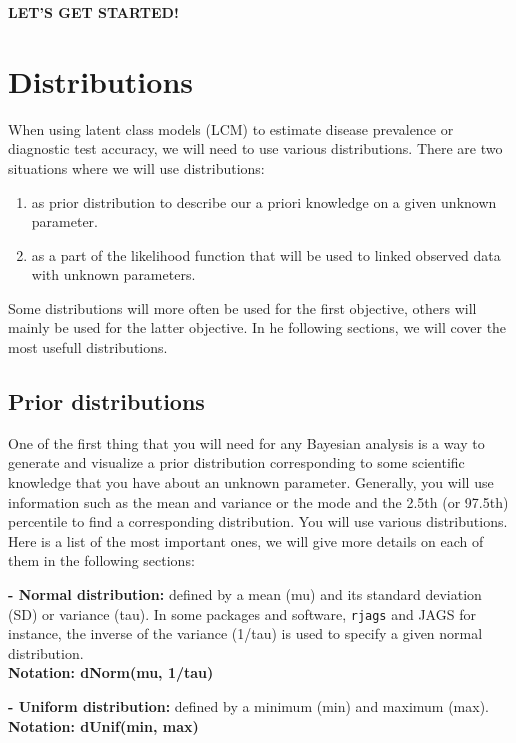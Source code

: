 \documentclass[
]{book}
\providecommand{\tightlist}{%
  \setlength{\itemsep}{0pt}\setlength{\parskip}{0pt}}
\begin{document}
\textbf{LET'S GET STARTED!}

\hypertarget{distributions}{%
\chapter{Distributions}\label{distributions}}

When using latent class models (LCM) to estimate disease prevalence or
diagnostic test accuracy, we will need to use various distributions.
There are two situations where we will use distributions:

\begin{enumerate}
\def\labelenumi{\arabic{enumi})}
\tightlist
\item
  as prior distribution to describe our a priori knowledge on a given
  unknown parameter.\\
\item
  as a part of the likelihood function that will be used to linked
  observed data with unknown parameters.
\end{enumerate}

Some distributions will more often be used for the first objective,
others will mainly be used for the latter objective. In he following
sections, we will cover the most usefull distributions.

\hypertarget{prior-distributions}{%
\section{Prior distributions}\label{prior-distributions}}

One of the first thing that you will need for any Bayesian analysis is a
way to generate and visualize a prior distribution corresponding to some
scientific knowledge that you have about an unknown parameter.
Generally, you will use information such as the mean and variance or the
mode and the 2.5th (or 97.5th) percentile to find a corresponding
distribution. You will use various distributions. Here is a list of the
most important ones, we will give more details on each of them in the
following sections:

\textbf{- Normal distribution:} defined by a mean (mu) and its standard
deviation (SD) or variance (tau). In some packages and software,
\texttt{rjags} and JAGS for instance, the inverse of the variance
(1/tau) is used to specify a given normal distribution.\\
\textbf{Notation: dNorm(mu, 1/tau)}

\textbf{- Uniform distribution:} defined by a minimum (min) and maximum
(max).\\
\textbf{Notation: dUnif(min, max)}
\end{document}
